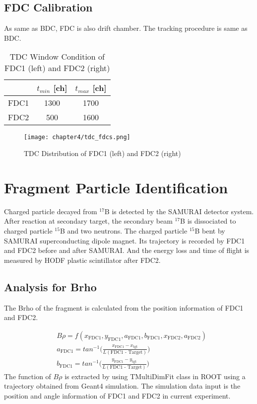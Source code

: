 \clearpage

\subsection{FDC Calibration}
As same as BDC, FDC is also drift chamber. The tracking procedure is same as BDC. %
\begin{table}[h]
    \centering
    \begin{tabular}{c|cc}
        \hline
        &$t_{min}$ [ch]&$t_{max}$ [ch]\\
        \hline
        FDC1&1300&1700\\
        FDC2&500&1600\\        
        \hline
    \end{tabular}
    \caption[TDC Window Condition of FDCs]{TDC Window Condition of FDC1 (left) and FDC2 (right)}
\end{table}
\begin{figure}
    \centering
    \texttt{[image: chapter4/tdc\_fdcs.png]}
    \caption[TDC Distribution of FDCs]{TDC Distribution of FDC1 (left) and FDC2 (right)}
\end{figure}


\section{Fragment Particle Identification}
Charged particle decayed from ${}^{17}$B is detected by the SAMURAI detector system. After reaction at secondary target, the secondary beam ${}^{17}$B is dissociated to charged particle ${}^{15}$B and two neutrons. The charged particle ${}^{15}$B bent by SAMURAI superconducting dipole magnet. Its trajectory is recorded by FDC1 and FDC2 before and after SAMURAI. And the energy loss and time of flight is measured by HODF plastic scintillator after FDC2.

\subsection{Analysis for Brho}
The Brho of the fragment is calculated from the position information of FDC1 and FDC2. 

\begin{align}
    &B\rho = f(x_{\text{FDC1}}, y_{\text{FDC1}}, a_{\text{FDC1}}, b_{\text{FDC1}}, x_{\text{FDC2}}, a_{\text{FDC2}})\\
    &a_{\text{FDC1}} = tan^{-1} \bigg( \frac{x_{\text{FDC1}} - x_{\text{tgt}}}{L(\text{FDC1 - Target})} \bigg)\\
    &b_{\text{FDC1}} = tan^{-1} \bigg( \frac{y_{\text{FDC1}} - y_{\text{tgt}}}{L(\text{FDC1 - Target})} \bigg)
\end{align}
The function of $B\rho$ is extracted by using TMultiDimFit class in ROOT using a trajectory obtained from Geant4 simulation. The simulation data input is the position and angle information of FDC1 and FDC2 in current experiment.

